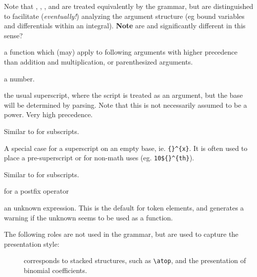 \documentclass{book}
\begin{document}
\begin{description}
 Note that , , ,  and  are treated
 equivalently by the grammar, but are distinguished to facilitate (\emph{eventually!}) 
 analyzing the argument structure (eg bound variables and differentials within an integral).
 \textbf{Note} are  and  significantly different in this sense?
\item[\code{VERTBAR}]
\item[\code{FUNCTION}] a function which (may) apply to following arguments with higher
   precedence than addition and multiplication, or parenthesized arguments.
\item[\code{NUMBER}] a number.
\item[\code{POSTSUPERSCRIPT}] the usual superscript, where the script is treated as
  an argument, but the base will be determined by parsing. Note that this is not
  necessarily assumed to be a power. Very high precedence.
\item[\code{POSTSUBSCRIPT}] Similar to  for subscripts.
\item[\code{FLOATINGSUPERSCRIPT}] A special case for a superscript on an empty base,
  ie. \verb|{}^{x}|.  It is often used to place a pre-superscript or for
  non-math uses (eg. \verb|10${}^{th}|).
\item[\code{FLOATINGSUBSCRIPT}] Similar to  for subscripts.
\item[\code{POSTFIX}] for a postfix operator
\item[\code{UNKNOWN}] an unknown expression. This is the default for token elements,
  and generates a warning if the unknown seems to be used as a function.
\end{description}

The following roles are not used in the grammar, but are used to capture
the presentation style:
\begin{description}
\item[] corresponds to stacked structures, such as
  \verb|\atop|, and the presentation of binomial coefficients.
\end{description}

\end{document}
